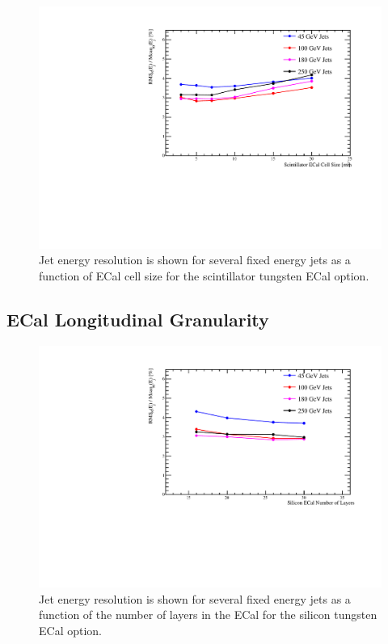\begin{figure}
  \includegraphics[width=\largefigwidth]{OptimisationStudies/Plots/JER_vs_ScintillatorECalCellSize.pdf}
  \caption[Jet energy resolution as a function of ECal cell size for the scintillator tungsten ECal option.]{Jet energy resolution is shown for several fixed energy jets as a function of ECal cell size for the scintillator tungsten ECal option.}
  \label{optstud:fig:scecalcells}
\end{figure}

\subsection{ECal Longitudinal Granularity}
\label{optstud:sec:ecal:nlayers}

\begin{figure}
  \includegraphics[width=\largefigwidth]{OptimisationStudies/Plots/JER_vs_SiliconECalNumberofLayers.pdf}
  \caption[Jet energy resolution as a function of the number of layers in the ECal for the silicon tungsten ECal option.]{Jet energy resolution is shown for several fixed energy jets as a function of the number of layers in the ECal for the silicon tungsten ECal option.}
  \label{optstud:fig:siecallayers}
\end{figure}


